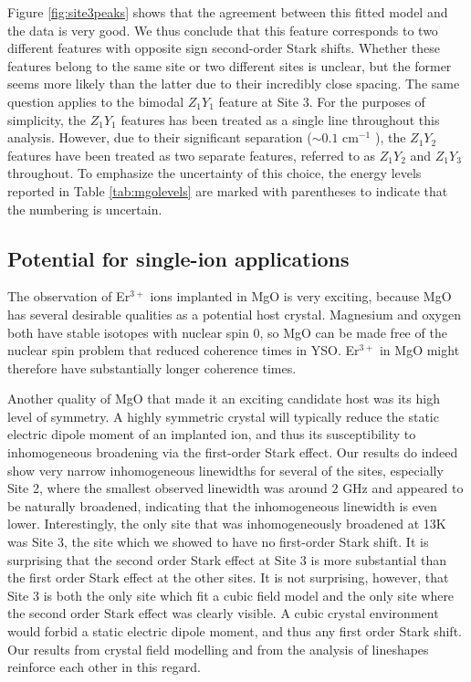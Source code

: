 \documentclass[12pt]{puthesis}
\newcommand{\erbium}[1][ ]{Er$^{3+}$#1}
\newcommand{\wn}[1][ ]{cm$^{-1}$#1}
\begin{document}
Figure \ref{fig:site3peaks} shows that the agreement between this fitted model and the data is very good. We thus conclude that this feature corresponds to two different features with opposite sign second-order Stark shifts. Whether these features belong to the same site or two different sites is unclear, but the former seems more likely than the latter due to their incredibly close spacing. The same question applies to the bimodal $Z_{1}Y_{1}$ feature at Site 3. For the purposes of simplicity, the $Z_{1}Y_{1}$ features has been treated as a single line throughout this analysis. However, due to their significant separation ($\sim 0.1$ \wn), the $Z_{1}Y_{2}$ features have been treated as two separate features, referred to as $Z_{1}Y_{2}$ and $Z_{1}Y_{3}$ throughout. To emphasize the uncertainty of this choice, the energy levels reported in Table \ref{tab:mgolevels} are marked with parentheses to indicate that the numbering is uncertain.

\subsection{Potential for single-ion applications}
The observation of \erbium ions implanted in MgO is very exciting, because MgO has several desirable qualities as a potential host crystal. Magnesium and oxygen both have stable isotopes with nuclear spin 0, so MgO can be made free of the nuclear spin problem that reduced coherence times in YSO. \erbium in MgO might therefore have substantially longer coherence times.

Another quality of MgO that made it an exciting candidate host was its high level of symmetry. A highly symmetric crystal will typically reduce the static electric dipole moment of an implanted ion, and thus its susceptibility to inhomogeneous broadening via the first-order Stark effect. Our results do indeed show very narrow inhomogeneous linewidths for several of the sites, especially Site 2, where the smallest observed linewidth was around $2$ GHz and appeared to be naturally broadened, indicating that the inhomogeneous linewidth is even lower. Interestingly, the only site that was inhomogeneously broadened at 13K was Site 3, the site which we showed to have no first-order Stark shift. It is surprising that the second order Stark effect at Site 3 is more substantial than the first order Stark effect at the other sites. It is not surprising, however, that Site 3 is both the only site which fit a cubic field model and the only site where the second order Stark effect was clearly visible. A cubic crystal environment would forbid a static electric dipole moment, and thus any first order Stark shift. Our results from crystal field modelling and from the analysis of lineshapes reinforce each other in this regard.
\end{document}
